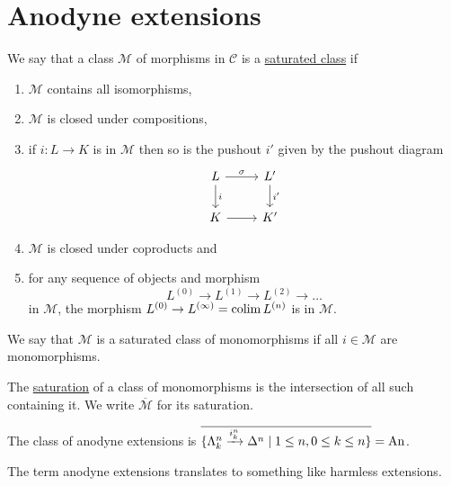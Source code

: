 \section{Anodyne extensions}

\begin{defi}
    We say that a class $\mathcal{M}$ of morphisms in $\mathcal{C}$ is a \underline{saturated class} if 
    \begin{enumerate}
        \item 
        $\mathcal{M}$ contains all isomorphisms,
        \item 
        $\mathcal{M}$ is closed under compositions,
        \item
        if $i:L \to K$ is in $\mathcal{M}$ then so is the pushout $i'$ given by the pushout diagram 
        \[
        \begin{tikzcd}
            L
            \arrow[d,"i"]
            \ar[r,"\sigma"]
            &
            L'
            \ar[d,"i'"]
            \\
            K
            \ar[r]
            &
            K'   
        \end{tikzcd}
        \]
        \item
        $\mathcal{M}$ is closed under coproducts and
        \item 
        for any sequence of objects and morphism 
        \[
        L^{(0)} \to L^{(1)} \to L^{(2)}\to \dotsc
        \]
        in $\mathcal{M}$, the morphism $L^{(0)} \to L^{(\infty)}=\operatorname{colim} L^{(n)}$ is in $\mathcal{M}$.
    \end{enumerate}
    We say that $\mathcal{M}$ is a saturated class of monomorphisms if all $i \in \mathcal{M}$ are monomorphisms.
\end{defi}

\begin{defi}
    The \underline{saturation} of a class of monomorphisms is the intersection of all such containing it. We write $\overline{\mathcal{M}}$ for its saturation.
\end{defi}

\begin{defi}
    The class of anodyne extensions is $\overline{\{ \Lambda_k^n \xrightarrow{i_k^n} \Delta^n \mid 1 \leq n ,0 \leq k \leq n \}}=\operatorname{An}$.
\end{defi}

\begin{rmk}
    The term anodyne extensions translates to something like harmless extensions.
\end{rmk}

